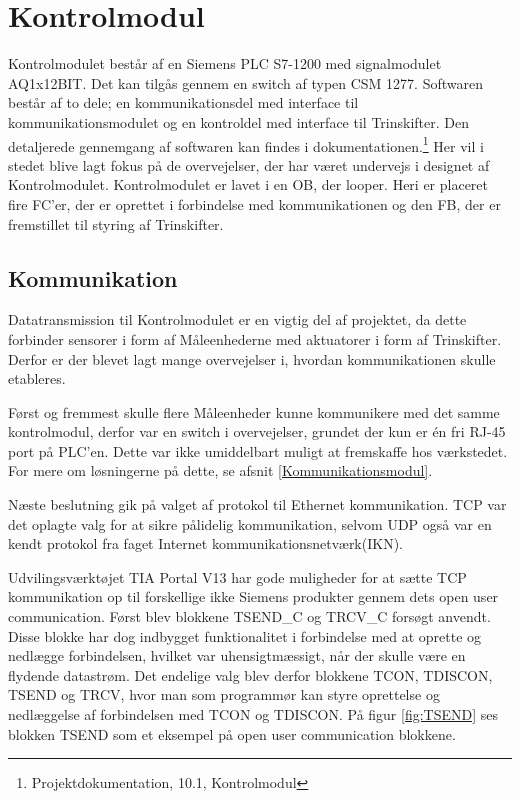 
\section{Kontrolmodul}

Kontrolmodulet består af en Siemens PLC S7-1200 med signalmodulet AQ1x12BIT. Det kan tilgås gennem en switch af typen CSM 1277.
Softwaren består af to dele; en kommunikationsdel med interface til kommunikationsmodulet og en kontroldel med interface til Trinskifter. Den detaljerede gennemgang af softwaren kan findes i dokumentationen.\footnote{Projektdokumentation, 10.1, Kontrolmodul} Her vil i stedet blive lagt fokus på de overvejelser, der har været undervejs i designet af Kontrolmodulet.
Kontrolmodulet er lavet i en OB, der looper. Heri er placeret fire FC'er, der er oprettet i forbindelse med kommunikationen og den FB, der er fremstillet til styring af Trinskifter.

\subsection{Kommunikation}
Datatransmission til Kontrolmodulet er en vigtig del af projektet, da dette forbinder sensorer i form af Måleenhederne med aktuatorer i form af Trinskifter. Derfor er der blevet lagt mange overvejelser i, hvordan kommunikationen skulle etableres.


Først og fremmest skulle flere Måleenheder kunne kommunikere med det samme kontrolmodul, derfor var en switch i overvejelser, grundet der kun er én fri RJ-45 port på PLC'en. Dette var ikke umiddelbart muligt at fremskaffe hos værkstedet. For mere om løsningerne på dette, se afsnit \ref{Kommunikationsmodul}.


Næste beslutning gik på valget af protokol til Ethernet kommunikation. TCP var det oplagte valg for at sikre pålidelig kommunikation, selvom UDP også var en kendt protokol fra faget Internet kommunikationsnetværk(IKN).


Udvilingsværktøjet TIA Portal V13 har gode muligheder for at sætte TCP kommunikation op til forskellige ikke Siemens produkter gennem dets open user communication. Først blev blokkene TSEND\_C og TRCV\_C forsøgt anvendt. Disse blokke har dog indbygget funktionalitet i forbindelse med at oprette og nedlægge forbindelsen, hvilket var uhensigtmæssigt, når der skulle være en flydende datastrøm. Det endelige valg blev derfor blokkene TCON, TDISCON, TSEND og TRCV, hvor man som programmør kan styre oprettelse og nedlæggelse af forbindelsen med TCON og TDISCON. På figur \ref{fig:TSEND} ses blokken TSEND som et eksempel på open user communication blokkene.

